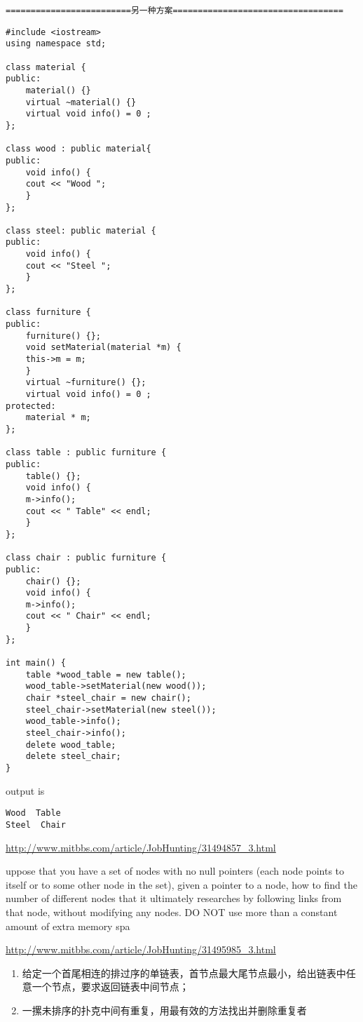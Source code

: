\documentclass[12pt]{book}
\begin{document}
\texttt{=========================另一种方案==================================}
\lstset{language=java,label= ,caption= ,numbers=none}
\begin{lstlisting}
#include <iostream>
using namespace std;

class material {
public:
    material() {}
    virtual ~material() {}
    virtual void info() = 0 ; 
};

class wood : public material{
public:
    void info() {
	cout << "Wood ";
    }
};

class steel: public material {
public:
    void info() {
	cout << "Steel ";
    }
};

class furniture {
public:
    furniture() {};
    void setMaterial(material *m) {
	this->m = m;
    }
    virtual ~furniture() {};
    virtual void info() = 0 ;
protected:
    material * m;
};

class table : public furniture {
public:
    table() {};
    void info() {
	m->info();
	cout << " Table" << endl;
    }
};

class chair : public furniture {
public:
    chair() {};
    void info() {
	m->info();
	cout << " Chair" << endl;
    }
};

int main() {
    table *wood_table = new table();
    wood_table->setMaterial(new wood());
    chair *steel_chair = new chair();
    steel_chair->setMaterial(new steel());
    wood_table->info();
    steel_chair->info();
    delete wood_table;
    delete steel_chair;
}
\end{lstlisting}

output is

\lstset{language=java,label= ,caption= ,numbers=none}
\begin{lstlisting}
Wood  Table
Steel  Chair
\end{lstlisting}

\url{http://www.mitbbs.com/article/JobHunting/31494857_3.html}

uppose that you have a set of nodes with no null pointers (each node points to itself or to some other node in the set), given a pointer to a node, how to find the number of different nodes that it ultimately researches by following links from that node, without modifying any nodes. DO NOT use more than a constant amount of extra memory spa

\url{http://www.mitbbs.com/article/JobHunting/31495985_3.html}

\begin{enumerate}
\item 给定一个首尾相连的排过序的单链表，首节点最大尾节点最小，给出链表中任意一个节点，要求返回链表中间节点；

\item 一摞未排序的扑克中间有重复，用最有效的方法找出并删除重复者
\end{enumerate}
\end{document}
